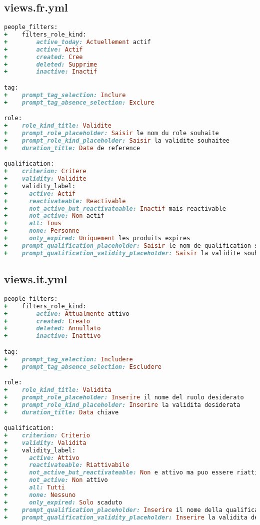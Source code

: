 \subsection{views.fr.yml}
\begin{lstlisting}[language=Ruby]
people_filters:
+    filters_role_kind:
+        active_today: Actuellement actif
+        active: Actif
+        created: Cree
+        deleted: Supprime
+        inactive: Inactif

tag:
+    prompt_tag_selection: Inclure
+    prompt_tag_absence_selection: Exclure

role:
+    role_kind_title: Validite
+    prompt_role_placeholder: Saisir le nom du role souhaite
+    prompt_role_kind_placeholder: Saisir la validite souhaitee
+    duration_title: Date de reference

qualification:
+    criterion: Critere
+    validity: Validite
+    validity_label:
+      active: Actif
+      reactivateable: Reactivable
+      not_active_but_reactivateable: Inactif mais reactivable
+      not_active: Non actif
+      all: Tous
+      none: Personne
+      only_expired: Uniquement les produits expires
+    prompt_qualification_placeholder: Saisir le nom de qualification souhaite
+    prompt_qualification_validity_placeholder: Saisir la validite souhaitee
\end{lstlisting}

\newpage

\subsection{views.it.yml}
\begin{lstlisting}[language=Ruby]
people_filters:
+    filters_role_kind:
+        active: Attualmente attivo
+        created: Creato
+        deleted: Annullato
+        inactive: Inattivo

tag:
+    prompt_tag_selection: Includere
+    prompt_tag_absence_selection: Escludere

role:
+    role_kind_title: Validita
+    prompt_role_placeholder: Inserire il nome del ruolo desiderato
+    prompt_role_kind_placeholder: Inserire la validita desiderata
+    duration_title: Data chiave

qualification:
+    criterion: Criterio
+    validity: Validita
+    validity_label:
+      active: Attivo
+      reactivateable: Riattivabile
+      not_active_but_reactivateable: Non e attivo ma puo essere riattivato
+      not_active: Non attivo
+      all: Tutti
+      none: Nessuno
+      only_expired: Solo scaduto
+    prompt_qualification_placeholder: Inserire il nome della qualifica desiderata
+    prompt_qualification_validity_placeholder: Inserire la validita desiderata
\end{lstlisting}

